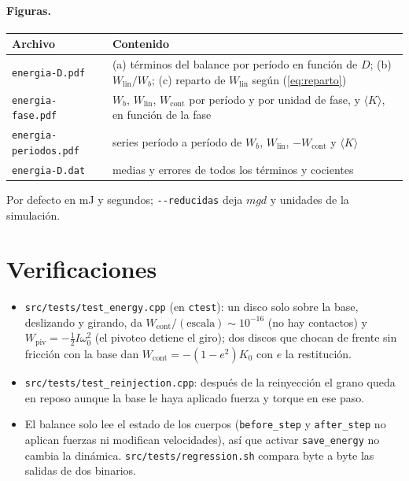 \documentclass[11pt,a4paper]{article}
\newcommand{\code}[1]{\texttt{#1}}
\newcommand{\ave}[1]{\langle #1 \rangle}
\newcommand{\Wb}{W_b}
\newcommand{\Wlin}{W_\text{lin}}
\newcommand{\Wpiv}{W_\text{piv}}
\newcommand{\Wcont}{W_\text{cont}}
\begin{document}
\paragraph{Figuras.}
\begin{center}
\begin{tabular}{lp{}}
  \toprule
  Archivo & Contenido \\
  \midrule
  \code{energia-D.pdf} & (a) términos del balance por período en función
    de $D$; (b) $\Wlin/\Wb$; (c) reparto de $\Wlin$ según
    (\ref{eq:reparto}) \\
  \code{energia-fase.pdf} & $\Wb$, $\Wlin$, $\Wcont$ por período y por
    unidad de fase, y $\ave{K}$, en función de la fase \\
  \code{energia-periodos.pdf} & series período a período de $\Wb$,
    $\Wlin$, $-\Wcont$ y $\ave{K}$ \\
  \code{energia-D.dat} & medias y errores de todos los términos y
    cocientes \\
  \bottomrule
\end{tabular}
\end{center}
Por defecto en mJ y segundos; \code{-{}-reducidas} deja $mgd$ y unidades
de la simulación.

\section{Verificaciones}
\label{sec:verif}

\begin{itemize}
  \item \code{src/tests/test\_energy.cpp} (en \code{ctest}): un disco
    solo sobre la base, deslizando y girando, da
    $\Wcont/(\text{escala}) \sim 10^{-16}$ (no hay contactos) y
    $\Wpiv = -\frac12 I \omega_0^2$ (el pivoteo detiene el giro); dos discos
    que chocan de frente sin fricción con la base dan
    $\Wcont = -(1-e^2) K_0$ con $e$ la restitución.
  \item \code{src/tests/test\_reinjection.cpp}: después de la reinyección
    el grano queda en reposo aunque la base le haya aplicado fuerza y
    torque en ese paso.
  \item El balance solo lee el estado de los cuerpos (\code{before\_step}
    y \code{after\_step} no aplican fuerzas ni modifican velocidades), así
    que activar \code{save\_energy} no cambia la dinámica.
    \code{src/tests/regression.sh} compara byte a byte las salidas de dos
    binarios.
\end{itemize}
\end{document}
